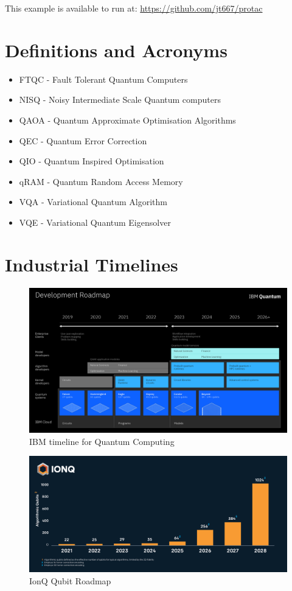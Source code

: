 \documentclass{article}
\theoremstyle{definition}
\begin{document}
This example is available to run at: \url{https://github.com/jt667/protac}




\clearpage
\printbibliography
\clearpage

\appendix 
\section{Definitions and Acronyms}
\begin{itemize}
    \item FTQC - Fault Tolerant Quantum Computers
    \item NISQ - Noisy Intermediate Scale Quantum computers
    \item QAOA - Quantum Approximate Optimisation Algorithms
    \item QEC - Quantum Error Correction
    \item QIO - Quantum Inspired Optimisation
    \item qRAM - Quantum Random Access Memory
    \item VQA - Variational Quantum Algorithm
    \item VQE - Variational Quantum Eigensolver

\end{itemize}
\section{Industrial Timelines}
\begin{figure}[htb]
    \centering
    \includegraphics[scale=0.1]{50863431103_aa832db592_o.jpg}
    \caption{IBM timeline for Quantum Computing \cite{wehden_faro_gambetta_2021} }
    \label{fig:ibm_timeline}
\end{figure}

\begin{figure}[htb]
    \centering
    \includegraphics[scale=0.1]{IonQ-roadmap-20201208.jpg}
    \caption{IonQ Qubit Roadmap}
    \label{fig:IonW_timeline}
\end{figure}
\end{document}

